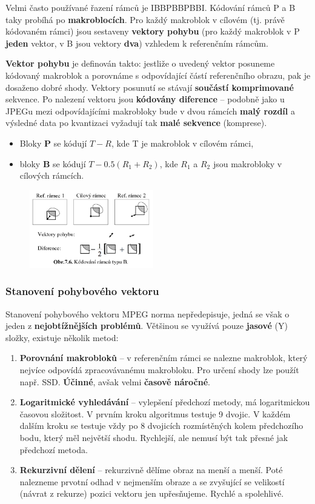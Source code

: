Velmi často používané řazení rámců je IBBPBBPBBI. Kódování rámců P a B taky probíhá po \textbf{makroblocích}. Pro každý makroblok v cílovém (tj. právě kódovaném rámci) jsou sestaveny \textbf{vektory pohybu} (pro každý makroblok v P \textbf{jeden} vektor, v B jsou vektory \textbf{dva}) vzhledem k referenčním rámcům.

\textbf{Vektor pohybu} je definován takto: jestliže o uvedený vektor posuneme kódovaný makroblok a porovnáme s odpovídající částí referenčního obrazu, pak je dosaženo dobré shody. Vektory posunutí se stávají \textbf{součástí komprimované} sekvence. Po nalezení vektoru jsou \textbf{kódovány diference} -- podobně jako u JPEGu mezi odpovídajícími makrobloky bude v dvou rámcích \textbf{malý rozdíl} a výsledné data po kvantizaci vyžadují tak \textbf{malé sekvence} (komprese).
\begin{itemize}
\item Bloky \textbf{P} se kódují $T-R$, kde T je makroblok v cílovém rámci,
\item bloky \textbf{B} se kódují $T - 0.5 (R_1 + R_2)$, kde $R_1$ a $R_2$ jsou makrobloky v cílových rámcích.
\end{itemize}

\begin{figure}[H]
	\centering
	\includegraphics[width=0.48\textwidth]{assets/7_mpeg_kodovani_B}
\end{figure}

\subsubsection{Stanovení pohybového vektoru}
Stanovení pohybového vektoru MPEG norma nepředepisuje, jedná se však o jeden z \textbf{nejobtížnějších problémů}. Většinou se využívá pouze \textbf{jasové} (Y) složky, existuje několik metod:

\begin{enumerate}
\item \textbf{Porovnání makrobloků} -- v referenčním rámci se nalezne makroblok, který nejvíce odpovídá zpracovávanému makrobloku. Pro určení shody lze použít např. SSD. \textbf{Účinné}, avšak velmi \textbf{časově náročné}.
\item \textbf{Logaritmické vyhledávání} -- vylepšení předchozí metody, má logaritmickou časovou složitost. V prvním kroku algoritmus testuje 9 dvojic. V každém dalším kroku se testuje vždy po 8 dvojicích rozmístěných kolem předchozího bodu, který měl největší shodu. Rychlejší, ale nemusí být tak přesné jak předchozí metoda.
\item \textbf{Rekurzivní dělení} -- rekurzivně dělíme obraz na menší a menší. Poté nalezneme prvotní odhad v nejmenším obraze a se zvyšující se velikostí (návrat z rekurze) pozici vektoru jen upřesňujeme. Rychlé a spolehlivé.
\end{enumerate}

